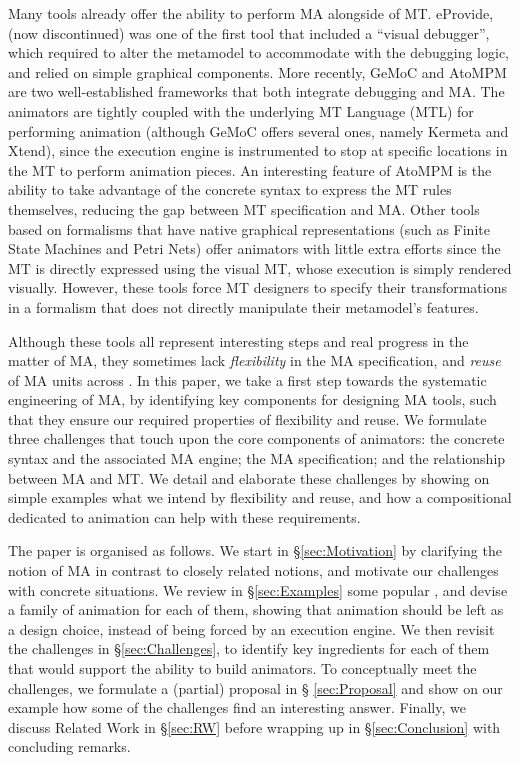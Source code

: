 Many \DSL tools already offer the ability to perform MA alongside of MT. eProvide,
\citep{Sadilek-Wachsmuth:2008} (now discontinued) was one of the first tool that
included a ``visual debugger'', which required to alter the \DSL metamodel to 
accommodate with the debugging logic, and relied on simple graphical components.
More recently, GeMoC \citep{combemale2016tool} and AtoMPM \cite{Syriani-Vangheluwe-etAl:2013}
are two well-established \DSL frameworks that both integrate debugging and MA. 
The animators are tightly coupled with the underlying MT Language (MTL) for 
performing animation (although GeMoC offers several ones, namely Kermeta and Xtend), since the
execution engine is instrumented to stop at specific locations in the MT to perform
animation pieces. An interesting feature of AtoMPM is the ability to take advantage
of the concrete syntax to express the MT rules themselves, reducing the gap between
MT specification and MA. Other tools based on formalisms that have native graphical
representations (such as Finite State Machines and Petri Nets) offer animators
with little extra efforts since the MT is directly expressed using the visual MT,
whose execution is simply rendered visually. However, these tools force MT designers to 
specify their transformations in a formalism that does not directly manipulate their
metamodel's features. 

Although these tools all represent interesting steps and real progress in the matter
of MA, they sometimes lack \emph{flexibility} in the MA specification, and 
\emph{reuse} of MA units across \DSLs. 
In this paper, we take a first step towards the systematic engineering of MA, by
identifying key components for designing MA tools, such that they ensure our
required properties of flexibility and reuse. We formulate three challenges that
touch upon the core components of animators: the concrete syntax and the associated
MA engine; the MA specification; and the relationship between MA and MT.
We detail and elaborate these challenges by showing on simple examples what we
intend by flexibility and reuse, and how a compositional \DSL dedicated to animation
can help with these requirements. 

The paper is organised as follows. We start in \S \ref{sec:Motivation} by clarifying
the notion of MA in contrast to closely related notions, and motivate our challenges
with concrete situations. We review in \S \ref{sec:Examples} some popular \DSLs,
and devise a family of animation for each of them, showing that animation should
be left as a design choice, instead of being forced by an execution engine. 
We then revisit the challenges in \S \ref{sec:Challenges}, to identify key 
ingredients for each of them that would support the ability to build animators.
To conceptually meet the challenges, we formulate a (partial) proposal in \S 
\ref{sec:Proposal} and show on our example \DSLs how some of the challenges find
an interesting answer. Finally, we discuss Related Work in \S \ref{sec:RW} before
wrapping up in \S \ref{sec:Conclusion} with concluding remarks.
